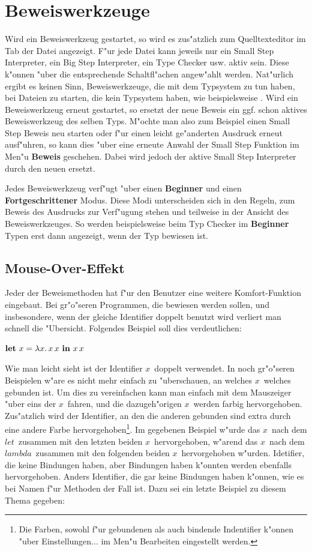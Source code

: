 \section {Beweiswerkzeuge}
\label{Beweiswerkzeuge} Wird ein Beweiswerkzeug gestartet, so wird
es zus"atzlich zum Quelltexteditor im Tab der Datei angezeigt. F"ur
jede Datei kann jeweils nur ein Small Step Interpreter, ein Big Step
Interpreter, ein Type Checker usw. aktiv sein. Diese k"onnen "uber die
entsprechende Schaltfl"achen angew"ahlt werden. Nat"urlich ergibt es keinen Sinn, Beweiswerkzeuge, die mit dem Typsystem zu tun haben, bei Dateien zu starten, die kein Typsystem haben, wie beispielsweise \LZERO. Wird ein
Beweiswerkzeug erneut gestartet, so ersetzt der neue Beweis ein ggf.
schon aktives Beweiswerkzeug des selben Typs. M"ochte man also zum
Beispiel einen Small Step Beweis neu starten oder f"ur einen leicht
ge"anderten Ausdruck erneut ausf"uhren, so kann dies "uber eine
erneute Anwahl der Small Step Funktion im Men"u {\bf Beweis}
geschehen. Dabei wird jedoch der aktive Small Step Interpreter durch
den neuen ersetzt.

Jedes Beweiswerkzeug verf"ugt "uber einen {\bf Beginner} und einen
{\bf Fortgeschrittener} Modus. Diese Modi unterscheiden sich in den
Regeln, zum Beweis des Ausdrucks zur Verf"ugung stehen und teilweise in der Ansicht des Beweiswerkzeuges. So werden beispielsweise beim Typ Checker im {\bf Beginner} Typen erst dann angezeigt, wenn der Typ bewiesen ist.

\subsection {Mouse-Over-Effekt}
Jeder der Beweismethoden hat f"ur den Benutzer eine weitere Komfort-Funktion eingebaut. Bei gr"o"seren Programmen, die bewiesen werden sollen, und insbesondere, wenn der gleiche Identifier doppelt benutzt wird verliert man schnell die "Ubersicht. Folgendes Beispiel soll dies verdeutlichen:

{\bf $\textbf{let}\ x = \lambda x.\,x\,x\ \textbf{in}\ x\,x$}

Wie man leicht sieht ist der Identifier \glqq$x$\grqq\ doppelt verwendet. In noch gr"o"seren Beispielen w"are es nicht mehr einfach zu "uberschauen, an welches \glqq$x$\grqq\ welches gebunden ist. Um dies zu vereinfachen kann man einfach mit dem Mauszeiger "uber eins der \glqq$x$\grqq\ fahren, und die dazugeh"origen \glqq$x$\grqq\ werden farbig hervorgehoben. Zus"atzlich wird der Identifier, an den die anderen gebunden sind extra durch eine andere Farbe hervorgehoben\footnote{Die Farben, sowohl f"ur gebundenen als auch bindende Indentifier k"onnen "uber Einstellungen... im Men"u Bearbeiten eingestellt werden.}. Im gegebenen Beispiel w"urde das \glqq$x$\grqq\ nach dem \glqq$let$\grqq\ zusammen mit den letzten beiden \glqq$x$\grqq\ hervorgehoben, w"arend das \glqq$x$\grqq\ nach dem \glqq$lambda$\grqq\ zusammen mit den folgenden beiden \glqq$x$\grqq\ hervorgehoben w"urden.
Idetifier, die keine Bindungen haben, aber Bindungen haben k"onnten werden ebenfalls hervorgehoben. Anders Identifier, die gar keine Bindungen haben k"onnen, wie es bei Namen f"ur Methoden der Fall ist. Dazu sei ein letzte Beispiel zu diesem Thema gegeben:

